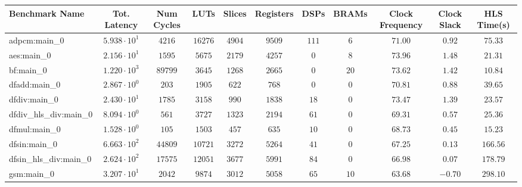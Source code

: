 \begin{tabular}{|l|c|c|c|c|c|c|c|c|c|c|}
\hline
Benchmark Name          & Tot. Latency           & Num Cycles & LUTs      & Slices    & Registers & DSPs    & BRAMs   & Clock Frequency & Clock Slack & HLS Time(s) \\
\hline
adpcm:main\_0           & $ 5.938 \cdot 10^{1} $ & $ 4216   $ & $ 16276 $ & $ 4904  $ & $ 9509  $ & $ 111 $ & $ 6   $ & $ 71.00       $ & $ 0.92    $ & $ 75.33   $ \\
aes:main\_0             & $ 2.156 \cdot 10^{1} $ & $ 1595   $ & $ 5675  $ & $ 2179  $ & $ 4257  $ & $ 0   $ & $ 8   $ & $ 73.96       $ & $ 1.48    $ & $ 21.31   $ \\
bf:main\_0              & $ 1.220 \cdot 10^{3} $ & $ 89799  $ & $ 3645  $ & $ 1268  $ & $ 2665  $ & $ 0   $ & $ 20  $ & $ 73.62       $ & $ 1.42    $ & $ 10.84   $ \\
dfadd:main\_0           & $ 2.867 \cdot 10^{0} $ & $ 203    $ & $ 1905  $ & $ 622   $ & $ 768   $ & $ 0   $ & $ 0   $ & $ 70.81       $ & $ 0.88    $ & $ 39.65   $ \\
dfdiv:main\_0           & $ 2.430 \cdot 10^{1} $ & $ 1785   $ & $ 3158  $ & $ 990   $ & $ 1838  $ & $ 18  $ & $ 0   $ & $ 73.47       $ & $ 1.39    $ & $ 23.57   $ \\
dfdiv\_hls\_div:main\_0 & $ 8.094 \cdot 10^{0} $ & $ 561    $ & $ 3727  $ & $ 1323  $ & $ 2194  $ & $ 61  $ & $ 0   $ & $ 69.31       $ & $ 0.57    $ & $ 25.36   $ \\
dfmul:main\_0           & $ 1.528 \cdot 10^{0} $ & $ 105    $ & $ 1503  $ & $ 457   $ & $ 635   $ & $ 10  $ & $ 0   $ & $ 68.73       $ & $ 0.45    $ & $ 15.23   $ \\
dfsin:main\_0           & $ 6.663 \cdot 10^{2} $ & $ 44809  $ & $ 10721 $ & $ 3272  $ & $ 5264  $ & $ 41  $ & $ 0   $ & $ 67.25       $ & $ 0.13    $ & $ 166.56  $ \\
dfsin\_hls\_div:main\_0 & $ 2.624 \cdot 10^{2} $ & $ 17575  $ & $ 12051 $ & $ 3677  $ & $ 5991  $ & $ 84  $ & $ 0   $ & $ 66.98       $ & $ 0.07    $ & $ 178.79  $ \\
gsm:main\_0             & $ 3.207 \cdot 10^{1} $ & $ 2042   $ & $ 9874  $ & $ 3012  $ & $ 5058  $ & $ 65  $ & $ 10  $ & $ 63.68       $ & $ -0.70   $ & $ 298.10  $ \\

\end{tabular}
